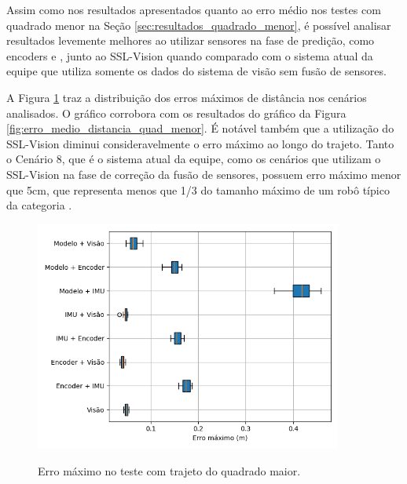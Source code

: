 \documentclass[acronym, symbols, table, deposito]{fei}
\begin{document}
		Assim como nos resultados apresentados quanto ao erro médio nos testes com quadrado menor na Seção \ref{sec:resultados_quadrado_menor}, é possível analisar resultados levemente melhores ao utilizar sensores na fase de predição, como encoders e , junto ao SSL-Vision quando comparado com o sistema atual da equipe que utiliza somente os dados do sistema de visão sem fusão de sensores.
	
		A Figura \ref{fig:erro_maximo_distancia_quad_maior} traz a distribuição dos erros máximos de distância nos cenários analisados. O gráfico corrobora com os resultados do gráfico da Figura \ref{fig:erro_medio_distancia_quad_menor}. É notável também que a utilização do SSL-Vision diminui consideravelmente o erro máximo ao longo do trajeto. Tanto o Cenário 8, que é o sistema atual da equipe, como os cenários que utilizam o SSL-Vision na fase de correção da fusão de sensores, possuem erro máximo menor que 5cm, que representa menos que 1/3 do tamanho máximo de um robô típico da categoria . %
		
		\begin{figure}[!htb]
			\centering
			\caption{Erro máximo no teste com trajeto do quadrado maior.}
			\includegraphics[width=0.9\textwidth]{../Dados/Graficos-Resultados/erro_maximo_distancia_quadrado_maior.png}
			\label{fig:erro_maximo_distancia_quad_maior}
		\end{figure}
	
\end{document}
